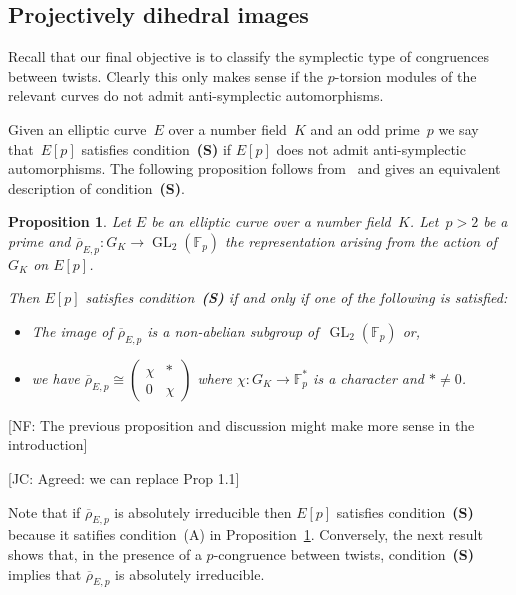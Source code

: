 \documentclass[12pt, reqno]{amsart}
\newcommand{\F}{\mathbb{F}}
\newcommand{\rhobar}{{\overline{\rho}}}
\newcommand{\GL}{\operatorname{GL}}
\numberwithin{equation}{section}
\newtheorem{proposition}[theorem]{Proposition}
\theoremstyle{definition}
\theoremstyle{remark}
\newcommand{\nf}[1]{{\color{blue} \textsf{[NF: #1]}}}
\newcommand{\jc}[1]{{\color{darkgreen} \textsf{[JC: #1]}}}
\begin{document}
\subsection{Projectively dihedral images}
Recall that our final objective is to classify the symplectic type of congruences between twists. Clearly this only makes sense if the $p$-torsion modules of the relevant curves do not admit anti-symplectic automorphisms. 

Given an elliptic curve~$E$ over a number field~$K$ and an odd prime~$p$ we say 
that~$E[p]$ satisfies condition~{\bf (S)} if $E[p]$ does not admit anti-symplectic automorphisms. The following proposition follows from~\cite{FKSym} and gives an equivalent description of condition~{\bf (S)}.

\begin{proposition} \label{P:conditionS}
Let $E$ be an elliptic curve over a number field~$K$. Let~$p > 2$ be a prime and $\rhobar_{E,p} : G_K \to \GL_2(\F_p)$ the representation arising from the action of~$G_K$ on $E[p]$. 

Then $E[p]$ satisfies condition~{\bf (S)} if and only if one of the following is satisfied:
 \begin{itemize}
 \item[(A)] The image of $\rhobar_{E,p}$ is a non-abelian subgroup of~$\GL_2(\F_p)$ or,
 \item[(B)] we have $\rhobar_{E,p} \cong \left( \begin{smallmatrix} \chi & * \\ 0 & \chi \end{smallmatrix} \right)$ where $\chi : G_K \to \F_p^*$ is a character
 and $* \neq 0$.
 \end{itemize}
\end{proposition}

\nf{The previous proposition and discussion might make more sense in
  the introduction}

\jc{Agreed: we can replace Prop 1.1}


Note that if $\rhobar_{E,p}$ is absolutely irreducible then $E[p]$ satisfies condition~{\bf (S)} because it satifies 
condition~(A) in Proposition~\ref{P:conditionS}. Conversely, the next result shows that, in the presence of a $p$-congruence between twists, condition~{\bf (S)} implies that
$\rhobar_{E,p}$ is absolutely irreducible.
\end{document}
